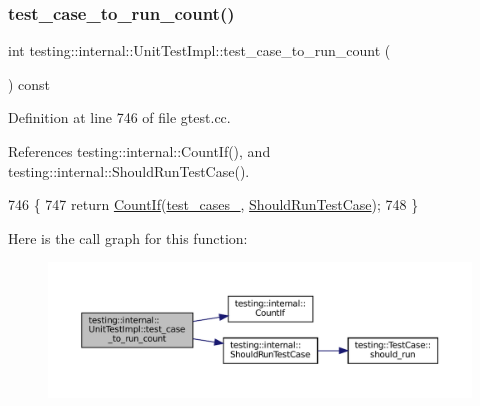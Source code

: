 \subsubsection{\texorpdfstring{test\+\_\+case\+\_\+to\+\_\+run\+\_\+count()}{test\_case\_to\_run\_count()}}
{\footnotesize\ttfamily int testing\+::internal\+::\+Unit\+Test\+Impl\+::test\+\_\+case\+\_\+to\+\_\+run\+\_\+count (\begin{DoxyParamCaption}{ }\end{DoxyParamCaption}) const}



Definition at line 746 of file gtest.\+cc.



References testing\+::internal\+::\+Count\+If(), and testing\+::internal\+::\+Should\+Run\+Test\+Case().


\begin{DoxyCode}
746                                                \{
747   \textcolor{keywordflow}{return} \hyperlink{namespacetesting_1_1internal_a1e77a774d910346eff11a86d8df783a5}{CountIf}(\hyperlink{classtesting_1_1internal_1_1UnitTestImpl_a79ec0f733ada2898efd1a7fbd8587fb3}{test\_cases\_}, \hyperlink{namespacetesting_1_1internal_a73e562dfef3eb7b30dfbb7b5e88e6df2}{ShouldRunTestCase});
748 \}
\end{DoxyCode}
Here is the call graph for this function\+:
\nopagebreak
\begin{figure}[H]
\begin{center}
\leavevmode
\includegraphics[width=350pt]{classtesting_1_1internal_1_1UnitTestImpl_aff65061646c6b9857b37097423500bfe_cgraph}
\end{center}
\end{figure}
\mbox{\label{classtesting_1_1internal_1_1UnitTestImpl_a0f15365d1d1ce00eaeb6f8a1370113ec}} 
